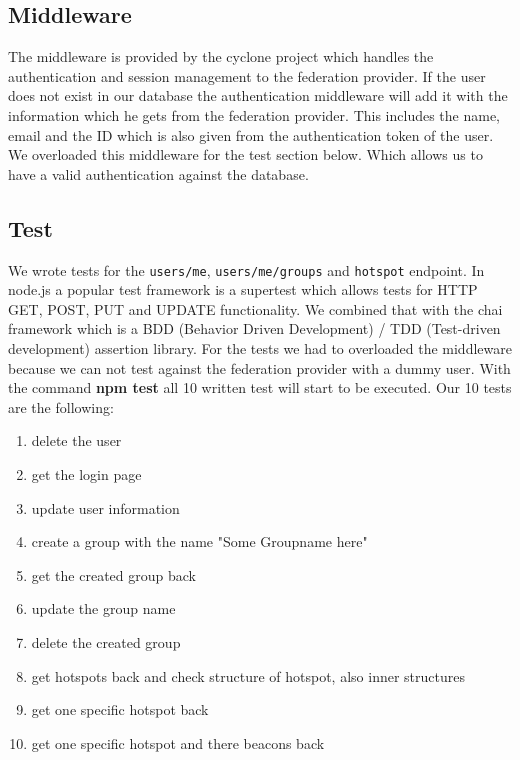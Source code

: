 
\subsection{Middleware}
\label{backend-middleware}

The middleware is provided by the cyclone project which handles the authentication and session management to the federation provider. If the user does not exist in our database the authentication middleware will add it with the information which he gets from the federation provider. This includes the name, email and the ID which is also given from the authentication token of the user. We overloaded this middleware for the test section below. Which allows us to have a valid authentication against the database.

\subsection{Test}

We wrote tests for the \texttt{users/me}, \texttt{users/me/groups} and \texttt{hotspot} endpoint. In node.js a popular test framework is a supertest which allows tests for HTTP GET, POST, PUT and UPDATE functionality. We combined that with the chai framework which is a BDD (Behavior Driven Development) / TDD (Test-driven development) assertion library. For the tests we had to overloaded the middleware because we can not test against the federation provider with a dummy user. With the command \textbf{npm test} all 10 written test will start to be executed. Our 10 tests are the following:

\begin{enumerate}
  \item delete the user
  \item get the login page
  \item update user information
  \item create a group with the name "Some Groupname here"
  \item get the created group back
  \item update the group name
  \item delete the created group
  \item get hotspots back and check structure of hotspot, also inner structures
  \item get one specific hotspot back
  \item get one specific hotspot and there beacons back
\end{enumerate}

